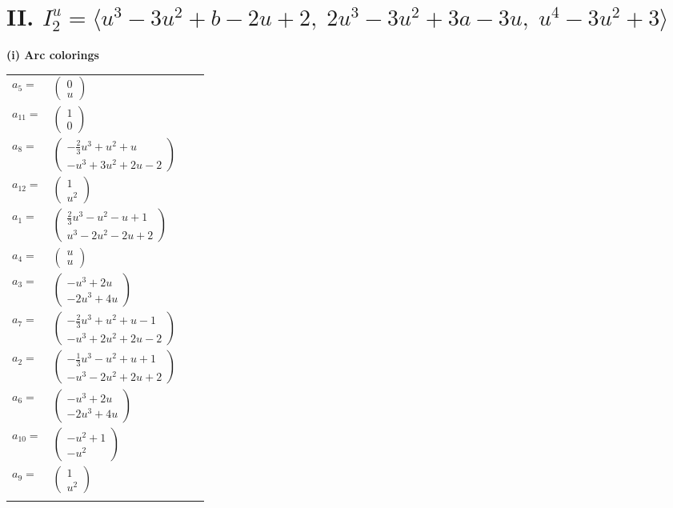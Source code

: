 \documentclass[1p]{elsarticle_modified}
\theoremstyle{definition}
\begin{document}
\centering \section*{II. $I^u_{2}= \langle u^3-3 u^2+b-2 u+2,\;2 u^3-3 u^2+3 a-3 u,\;u^4-3 u^2+3 \rangle$}
\flushleft \textbf{(i) Arc colorings}\\
\begin{tabular}{m{7pt} m{180pt} m{7pt} m{180pt} }
\flushright $a_{5}=$&$\begin{pmatrix}0\\u\end{pmatrix}$ \\
\flushright $a_{11}=$&$\begin{pmatrix}1\\0\end{pmatrix}$ \\
\flushright $a_{8}=$&$\begin{pmatrix}-\frac{2}{3} u^3+u^2+u\\- u^3+3 u^2+2 u-2\end{pmatrix}$ \\
\flushright $a_{12}=$&$\begin{pmatrix}1\\u^2\end{pmatrix}$ \\
\flushright $a_{1}=$&$\begin{pmatrix}\frac{2}{3} u^3- u^2- u+1\\u^3-2 u^2-2 u+2\end{pmatrix}$ \\
\flushright $a_{4}=$&$\begin{pmatrix}u\\u\end{pmatrix}$ \\
\flushright $a_{3}=$&$\begin{pmatrix}- u^3+2 u\\-2 u^3+4 u\end{pmatrix}$ \\
\flushright $a_{7}=$&$\begin{pmatrix}-\frac{2}{3} u^3+u^2+u-1\\- u^3+2 u^2+2 u-2\end{pmatrix}$ \\
\flushright $a_{2}=$&$\begin{pmatrix}-\frac{1}{3} u^3- u^2+u+1\\- u^3-2 u^2+2 u+2\end{pmatrix}$ \\
\flushright $a_{6}=$&$\begin{pmatrix}- u^3+2 u\\-2 u^3+4 u\end{pmatrix}$ \\
\flushright $a_{10}=$&$\begin{pmatrix}- u^2+1\\- u^2\end{pmatrix}$ \\
\flushright $a_{9}=$&$\begin{pmatrix}1\\u^2\end{pmatrix}$\\&\end{tabular}
\end{document}
